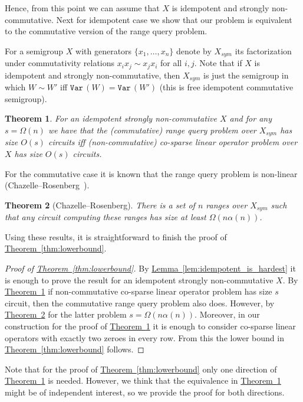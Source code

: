 \documentclass[11pt]{article}
\numberwithin{equation}{section}
\newtheorem{theorem}{Theorem}[section]
\theoremstyle{definition}
\theoremstyle{plain}
\newcommand{\expref}[2]{\hyperref[#2]{#1~\ref{#2}}}
\theoremstyle{plain}\newtheorem{observation}[theorem]{Observation}
\newcommand{\var}{\texttt{Var}\,}  %
\begin{document}
Hence, from this point we can assume that $X$ is idempotent and strongly
non-commutative. Next for idempotent case we show that our problem is equivalent
to the commutative version of the range query problem.

For a semigroup $X$ with generators $\{x_1,\ldots, x_n\}$ denote by $X_{sym}$
its factorization under commutativity relations
$x_i x_j \sim x_j x_i$ for all $i,j$. Note that if $X$ is idempotent and
strongly non-commutative, then $X_{sym}$ is just the semigroup in which
$W \sim W'$ iff $\var(W)=\var(W')$ (this is free idempotent commutative
semigroup).

\begin{theorem}\label{thm:equivalence}
For an idempotent strongly non-commutative $X$ and for any $s=\Omega(n)$ we have
that the (commutative)
%
%
range query problem
over $X_{sym}$ has size $O(s)$ circuits
iff (non-commutative)
%
%
co-sparse
linear operator problem over $X$ has size $O(s)$
circuits.
\end{theorem}

%
%
%
%
%
%
%
For the commutative case it is known that
%
%
the range query
problem is non-linear
(Chazelle--Rosenberg~\cite{DBLP:journals/ijcga/ChazelleR91}).  %
\begin{theorem}[Chazelle--Rosenberg]\label{thm:chazelle}
	There is a set of $n$ ranges over $X_{sym}$ such that any circuit
	computing these ranges has size at least $\Omega(n \alpha(n))$.
\end{theorem}

Using these results, it is straightforward to finish the proof of
\expref{Theorem}{thm:lowerbound}.

\begin{proof}[Proof of {\expref{Theorem}{thm:lowerbound}}]

By \expref{Lemma}{lem:idempotent_is_hardest} it is enough to prove the result for an idempotent strongly non-commutative $X$.
By \expref{Theorem}{thm:equivalence} if non-commutative
%
%
co-sparse
linear
operator problem has size $s$ circuit, then the commutative
%
%
range query
problem also does. However, by \expref{Theorem}{thm:chazelle} for the latter problem $s=\Omega(n \alpha(n))$.
Moreover, in our construction for the proof of \expref{Theorem}{thm:equivalence} it
is enough to consider
%
%
co-sparse
linear operators with exactly two zeroes in every
row. From this the lower bound in \expref{Theorem}{thm:lowerbound} follows.
\end{proof}

Note that for the proof of \expref{Theorem}{thm:lowerbound} only one direction of
\expref{Theorem}{thm:equivalence} is needed. However, we think that the equivalence
in \expref{Theorem}{thm:equivalence} might be of independent interest, so we provide
the proof for both directions.
\end{document}
